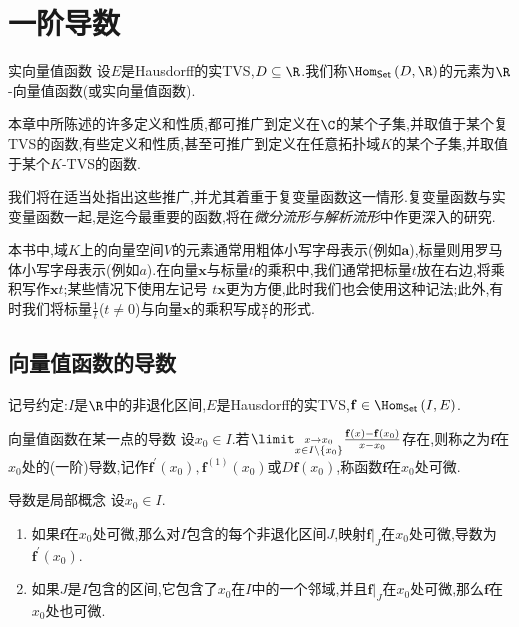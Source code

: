 \chapter{一阶导数}

\begin{definition}{实向量值函数}{}
	设$E$是Hausdorff的实TVS,$D\subseteq\R$.我们称$\Hom_{\mathsf{Set}}\left(D,\R\right)$的元素为$\R$-向量值函数(或实向量值函数).
\end{definition}

\begin{remark}{}{}
	本章中所陈述的许多定义和性质,都可推广到定义在$\C$的某个子集,并取值于某个复TVS的函数,有些定义和性质,甚至可推广到定义在任意拓扑域$K$的某个子集,并取值于某个$K$-TVS的函数.
	
	我们将在适当处指出这些推广,并尤其着重于复变量函数这一情形.复变量函数与实变量函数一起,是迄今最重要的函数,将在\textit{微分流形与解析流形}中作更深入的研究.
\end{remark}

\begin{convention}{}{}
	本书中,域$K$上的向量空间$V$的元素通常用粗体小写字母表示(例如$\mathbf{a}$),标量则用罗马体小写字母表示(例如$a$).在向量$\mathbf{x}$与标量$t$的乘积中,我们通常把标量$t$放在右边,将乘积写作$\mathbf{x}t$;某些情况下使用左记号 $t\mathbf{x}$更为方便,此时我们也会使用这种记法;此外,有时我们将标量$\frac{1}{t}$($t\neq 0$)与向量$\mathbf{x}$的乘积写成$\frac{\mathbf{x}}{t}$的形式.
\end{convention}

\section{向量值函数的导数}

记号约定:$I$是$\R$中的非退化区间,$E$是Hausdorff的实TVS,$\mathbf{f}\in\Hom_{\mathsf{Set}}\left(I,E\right)$.

\begin{definition}{向量值函数在某一点的导数}{}
	设$x_{0}\in I$.若$\limit_{\substack{x\to x_{0}\\ x\in I\setminus\left\{x_{0}\right\}}}\frac{\mathbf{f}\left(x\right)-\mathbf{f}\left(x_{0}\right)}{x-x_{0}}$存在,则称之为$\mathbf{f}$在$x_{0}$处的(一阶)导数,记作$\mathbf{f}^{\prime}\left(x_{0}\right),\mathbf{f}^{\left(1\right)}\left(x_{0}\right)$或$D\mathbf{f}\left(x_{0}\right)$,称函数$\mathbf{f}$在$x_{0}$处可微.
\end{definition}

\begin{proposition}{导数是局部概念}{}
	设$x_{0}\in I$.
	\begin{enumerate}
		\item 如果$\mathbf{f}$在$x_{0}$处可微,那么对$I$包含的每个非退化区间$J$,映射$\mathbf{f}|_{J}$在$x_{0}$处可微,导数为$\mathbf{f}^{\prime}\left(x_{0}\right)$.
		\item 如果$J$是$I$包含的区间,它包含了$x_{0}$在$I$中的一个邻域,并且$\mathbf{f}|_{J}$在$x_{0}$处可微,那么$\mathbf{f}$在$x_{0}$处也可微.
	\end{enumerate}
\end{proposition}

